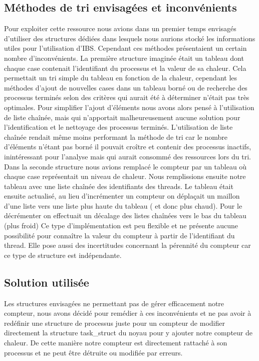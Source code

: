 \subsection{Méthodes de tri envisagées et inconvénients}
Pour exploiter cette ressource nous avions dans un premier temps envisagés d'utiliser des structures dédiées dans lesquels nous aurions stocké les informations utiles pour l'utilisation d'IBS. Cependant ces méthodes présentaient un certain nombre d'inconvénients.
La première structure imaginée était un tableau dont chaque case contenait l'identifiant du processus et la valeur de sa chaleur. Cela permettait un tri simple du tableau en fonction de la chaleur, cependant les méthodes d'ajout de nouvelles cases dans un tableau borné ou de recherche des processus terminés selon des critères qui aurait été à déterminer n'était pas très optimales.
Pour simplifier l'ajout d'éléments nous avons alors pensé à l'utilisation de liste chaînée, mais qui n'apportait malheureusement aucune solution pour l'identification et le nettoyage des processus terminés. L'utilisation de liste chaînée rendait même moins performant la méthode de tri car le nombre d'éléments n'étant pas borné il pouvait croître et contenir des processus inactifs, inintéressant pour l'analyse mais qui aurait consommé des ressources lors du tri.
Dans la seconde structure nous avions remplacé le compteur par un tableau où chaque case représentait un niveau de chaleur. Nous remplissions ensuite notre tableau avec une liste chaînée des identifiants des threads. Le tableau était ensuite actualisé, au lieu d'incrémenter un compteur on déplaçait un maillon d'une liste vers une liste plus haute du tableau ( et donc plus chaud). Pour le décrémenter on effectuait un décalage des listes chaînées vers le bas du tableau (plus froid)
Ce type d'implémentation est peu flexible et ne présente aucune possibilité pour connaître la valeur du compteur à partir de l'identifiant du thread. Elle pose aussi des incertitudes concernant la pérennité du compteur car ce type de structure est indépendante.
\subsection{Solution utilisée}
Les structures envisagées ne permettant pas de gérer efficacement notre compteur, nous avons décidé pour remédier à ces inconvénients et ne pas avoir à redéfinir une structure de processus juste pour un compteur de modifier directement la structure task\_struct du noyau pour y ajouter notre compteur de chaleur. De cette manière notre compteur est directement rattaché à son processus et ne peut être détruite ou modifiée par erreurs.
